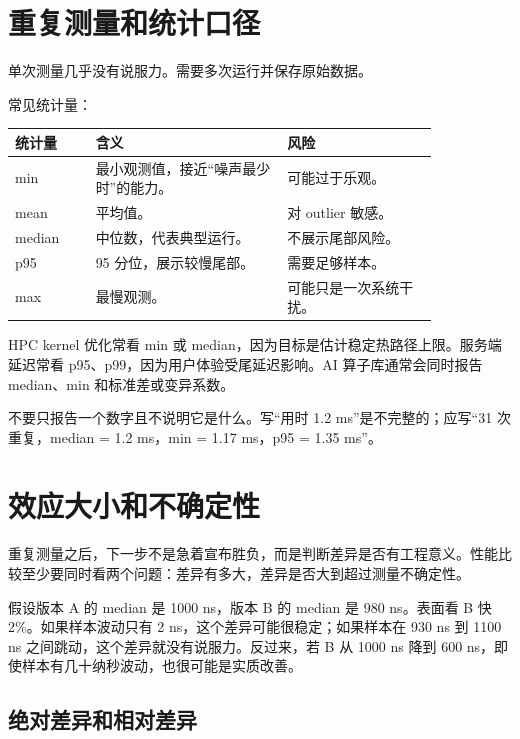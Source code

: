 \section{重复测量和统计口径}

单次测量几乎没有说服力。需要多次运行并保存原始数据。

常见统计量：

\begin{center}
\begin{tabular}{p{0.16\linewidth}p{0.38\linewidth}p{0.30\linewidth}}
\toprule
统计量 & 含义 & 风险 \\
\midrule
min & 最小观测值，接近“噪声最少时”的能力。 & 可能过于乐观。 \\
mean & 平均值。 & 对 outlier 敏感。 \\
median & 中位数，代表典型运行。 & 不展示尾部风险。 \\
p95 & 95 分位，展示较慢尾部。 & 需要足够样本。 \\
max & 最慢观测。 & 可能只是一次系统干扰。 \\
\bottomrule
\end{tabular}
\end{center}

HPC kernel 优化常看 min 或 median，因为目标是估计稳定热路径上限。服务端延迟常看 p95、p99，因为用户体验受尾延迟影响。AI 算子库通常会同时报告 median、min 和标准差或变异系数。

\begin{warningbox}
不要只报告一个数字且不说明它是什么。写“用时 1.2 ms”是不完整的；应写“31 次重复，median = 1.2 ms，min = 1.17 ms，p95 = 1.35 ms”。
\end{warningbox}

\section{效应大小和不确定性}

重复测量之后，下一步不是急着宣布胜负，而是判断差异是否有工程意义。性能比较至少要同时看两个问题：差异有多大，差异是否大到超过测量不确定性。

假设版本 A 的 median 是 1000 ns，版本 B 的 median 是 980 ns。表面看 B 快 2\%。如果样本波动只有 2 ns，这个差异可能很稳定；如果样本在 930 ns 到 1100 ns 之间跳动，这个差异就没有说服力。反过来，若 B 从 1000 ns 降到 600 ns，即使样本有几十纳秒波动，也很可能是实质改善。

\subsection{绝对差异和相对差异}

